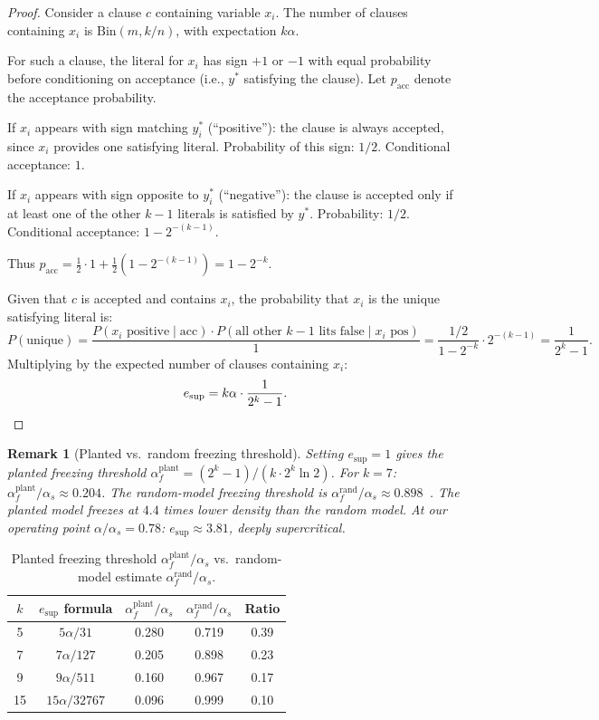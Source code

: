 \documentclass[11pt]{article}
\newtheorem{remark}[theorem]{Remark}
\begin{document}
\begin{proof}
Consider a clause $c$ containing variable $x_i$.  The number of clauses containing $x_i$ is $\mathrm{Bin}(m, k/n)$, with expectation $k\alpha$.

For such a clause, the literal for $x_i$ has sign $+1$ or $-1$ with equal probability before conditioning on acceptance (i.e., $y^*$ satisfying the clause).  Let $p_{\mathrm{acc}}$ denote the acceptance probability.

If $x_i$ appears with sign matching $y^*_i$ (``positive''): the clause is always accepted, since $x_i$ provides one satisfying literal.  Probability of this sign: $1/2$.  Conditional acceptance: $1$.

If $x_i$ appears with sign opposite to $y^*_i$ (``negative''): the clause is accepted only if at least one of the other $k-1$ literals is satisfied by $y^*$.  Probability: $1/2$.  Conditional acceptance: $1 - 2^{-(k-1)}$.

Thus $p_{\mathrm{acc}} = \frac{1}{2} \cdot 1 + \frac{1}{2}(1 - 2^{-(k-1)}) = 1 - 2^{-k}$.

Given that $c$ is accepted and contains $x_i$, the probability that $x_i$ is the unique satisfying literal is:
\[
P(\text{unique}) = \frac{P(x_i \text{ positive} \mid \text{acc}) \cdot P(\text{all other } k{-}1 \text{ lits false} \mid x_i \text{ pos})}{1} = \frac{1/2}{1 - 2^{-k}} \cdot 2^{-(k-1)} = \frac{1}{2^k - 1}.
\]
Multiplying by the expected number of clauses containing $x_i$:
\[
e_{\mathrm{sup}} = k\alpha \cdot \frac{1}{2^k - 1}. \qedhere
\]
\end{proof}

\begin{remark}[Planted vs.\ random freezing threshold]\label{rem:threshold}
Setting $e_{\mathrm{sup}} = 1$ gives the planted freezing threshold $\alpha_f^{\mathrm{plant}} = (2^k - 1)/(k \cdot 2^k \ln 2)$.  For $k = 7$: $\alpha_f^{\mathrm{plant}}/\alpha_s \approx 0.204$.  The random-model freezing threshold is $\alpha_f^{\mathrm{rand}}/\alpha_s \approx 0.898$~\cite{ART09,CZ12}.  The planted model freezes at $4.4$ times lower density than the random model.  At our operating point $\alpha/\alpha_s = 0.78$: $e_{\mathrm{sup}} \approx 3.81$, deeply supercritical.
\end{remark}

\begin{table}[ht]
\centering
\caption{Planted freezing threshold $\alpha_f^{\mathrm{plant}}/\alpha_s$ vs.\ random-model estimate $\alpha_f^{\mathrm{rand}}/\alpha_s$.}\label{tab:freeze}
\begin{tabular}{@{}ccccc@{}}
\toprule
$k$ & $e_{\mathrm{sup}}$ formula & $\alpha_f^{\mathrm{plant}}/\alpha_s$ & $\alpha_f^{\mathrm{rand}}/\alpha_s$ & Ratio \\
\midrule
5  & $5\alpha/31$    & 0.280 & 0.719 & 0.39 \\
7  & $7\alpha/127$   & 0.205 & 0.898 & 0.23 \\
9  & $9\alpha/511$   & 0.160 & 0.967 & 0.17 \\
15 & $15\alpha/32767$ & 0.096 & 0.999 & 0.10 \\
\bottomrule
\end{tabular}
\end{table}
\end{document}
